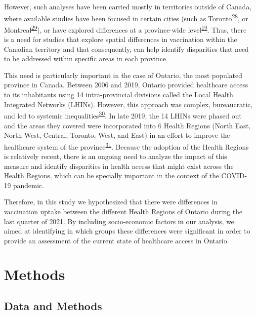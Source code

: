 \documentclass[
  letterpaper,
  DIV=11,
  numbers=noendperiod]{scrartcl}
\begin{document}
However, such analyses have been carried mostly in territories outside
of Canada, where available studies have been focused in certain cities
(such as Toronto\textsuperscript{\protect\hyperlink{ref-choi2021}{28}},
or Montreal\textsuperscript{\protect\hyperlink{ref-mckinnon2021}{29}}),
or have explored differences at a province-wide
level\textsuperscript{\protect\hyperlink{ref-guay2022}{19}}. Thus, there
is a need for studies that explore spatial differences in vaccination
within the Canadian territory and that consequently, can help identify
disparities that need to be addressed within specific areas in each
province.

This need is particularly important in the case of Ontario, the most
populated province in Canada. Between 2006 and 2019, Ontario provided
healthcare access to its inhabitants using 14 intra-provincial divisions
called the Local Health Integrated Networks (LHINs). However, this
approach was complex, bureaucratic, and led to systemic
inequalities\textsuperscript{\protect\hyperlink{ref-tsasis2012}{30}}. In
late 2019, the 14 LHINs were phased out and the areas they covered were
incorporated into 6 Health Regions (North East, North West, Central,
Toronto, West, and East) in an effort to improve the healthcare system
of the province\textsuperscript{\protect\hyperlink{ref-dong2022}{31}}.
Because the adoption of the Health Regions is relatively recent, there
is an ongoing need to analyze the impact of this measure and identify
disparities in health access that might exist across the Health Regions,
which can be specially important in the context of the COVID-19
pandemic.

Therefore, in this study we hypothesized that there were differences in
vaccination uptake between the different Health Regions of Ontario
during the last quarter of 2021. By including socio-economic factors in
our analysis, we aimed at identifying in which groups these differences
were significant in order to provide an assessment of the current state
of healthcare access in Ontario.

\hypertarget{methods}{%
\section{Methods}\label{methods}}

\hypertarget{sec-data}{%
\subsection{Data and Methods}\label{sec-data}}
\end{document}
